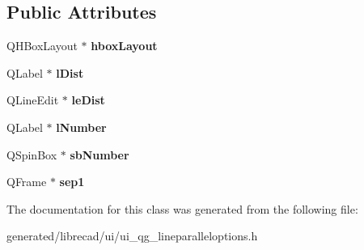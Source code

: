 \subsection*{Public Attributes}
\begin{DoxyCompactItemize}
\item 
\hypertarget{classUi__QG__LineParallelOptions_a58bc4aacba73e3974c6aa8df66802eb3}{Q\-H\-Box\-Layout $\ast$ {\bfseries hbox\-Layout}}\label{classUi__QG__LineParallelOptions_a58bc4aacba73e3974c6aa8df66802eb3}

\item 
\hypertarget{classUi__QG__LineParallelOptions_af90f91dcd19bf603169875d39becff6c}{Q\-Label $\ast$ {\bfseries l\-Dist}}\label{classUi__QG__LineParallelOptions_af90f91dcd19bf603169875d39becff6c}

\item 
\hypertarget{classUi__QG__LineParallelOptions_a2a03f19f5ac615548fedeabcd3ffba5c}{Q\-Line\-Edit $\ast$ {\bfseries le\-Dist}}\label{classUi__QG__LineParallelOptions_a2a03f19f5ac615548fedeabcd3ffba5c}

\item 
\hypertarget{classUi__QG__LineParallelOptions_a3f31a70f069963f266960789be8f997a}{Q\-Label $\ast$ {\bfseries l\-Number}}\label{classUi__QG__LineParallelOptions_a3f31a70f069963f266960789be8f997a}

\item 
\hypertarget{classUi__QG__LineParallelOptions_a74dc979c319e79e2d89d4a2a42cfff52}{Q\-Spin\-Box $\ast$ {\bfseries sb\-Number}}\label{classUi__QG__LineParallelOptions_a74dc979c319e79e2d89d4a2a42cfff52}

\item 
\hypertarget{classUi__QG__LineParallelOptions_a2ee1faea5111a8063cb17140ef90eaa1}{Q\-Frame $\ast$ {\bfseries sep1}}\label{classUi__QG__LineParallelOptions_a2ee1faea5111a8063cb17140ef90eaa1}

\end{DoxyCompactItemize}


The documentation for this class was generated from the following file\-:\begin{DoxyCompactItemize}
\item 
generated/librecad/ui/ui\-\_\-qg\-\_\-lineparalleloptions.\-h\end{DoxyCompactItemize}
